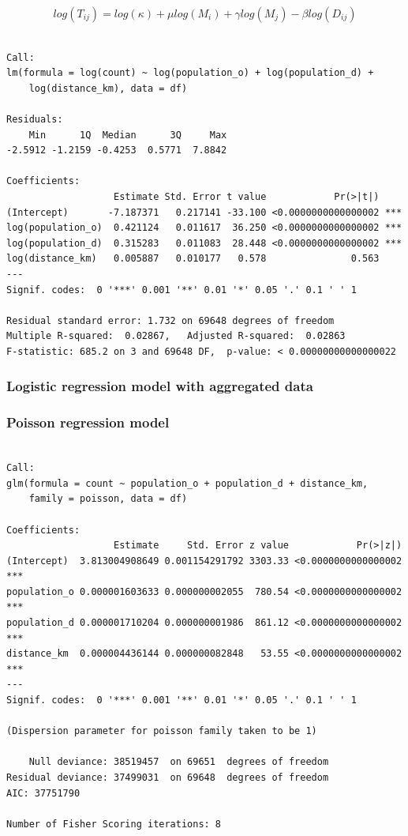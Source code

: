 \documentclass[
  a4paper, 
  twoside,
  final
]{article}
\newcounter{code}
\begin{document}
\[
log(T_{ij}) = log(\kappa) + \mu log( M_{i} )+ \gamma log( M_{j} ) - \beta log( D_{ij} )
\]

\begin{verbatim}

Call:
lm(formula = log(count) ~ log(population_o) + log(population_d) + 
    log(distance_km), data = df)

Residuals:
    Min      1Q  Median      3Q     Max 
-2.5912 -1.2159 -0.4253  0.5771  7.8842 

Coefficients:
                   Estimate Std. Error t value            Pr(>|t|)    
(Intercept)       -7.187371   0.217141 -33.100 <0.0000000000000002 ***
log(population_o)  0.421124   0.011617  36.250 <0.0000000000000002 ***
log(population_d)  0.315283   0.011083  28.448 <0.0000000000000002 ***
log(distance_km)   0.005887   0.010177   0.578               0.563    
---
Signif. codes:  0 '***' 0.001 '**' 0.01 '*' 0.05 '.' 0.1 ' ' 1

Residual standard error: 1.732 on 69648 degrees of freedom
Multiple R-squared:  0.02867,   Adjusted R-squared:  0.02863 
F-statistic: 685.2 on 3 and 69648 DF,  p-value: < 0.00000000000000022
\end{verbatim}

\hypertarget{logistic-regression-model-with-aggregated-data}{%
\subsubsection{Logistic regression model with aggregated
data}\label{logistic-regression-model-with-aggregated-data}}

\hypertarget{poisson-regression-model}{%
\subsubsection{Poisson regression
model}\label{poisson-regression-model}}

\begin{verbatim}

Call:
glm(formula = count ~ population_o + population_d + distance_km, 
    family = poisson, data = df)

Coefficients:
                   Estimate     Std. Error z value            Pr(>|z|)    
(Intercept)  3.813004908649 0.001154291792 3303.33 <0.0000000000000002 ***
population_o 0.000001603633 0.000000002055  780.54 <0.0000000000000002 ***
population_d 0.000001710204 0.000000001986  861.12 <0.0000000000000002 ***
distance_km  0.000004436144 0.000000082848   53.55 <0.0000000000000002 ***
---
Signif. codes:  0 '***' 0.001 '**' 0.01 '*' 0.05 '.' 0.1 ' ' 1

(Dispersion parameter for poisson family taken to be 1)

    Null deviance: 38519457  on 69651  degrees of freedom
Residual deviance: 37499031  on 69648  degrees of freedom
AIC: 37751790

Number of Fisher Scoring iterations: 8
\end{verbatim}
\end{document}
